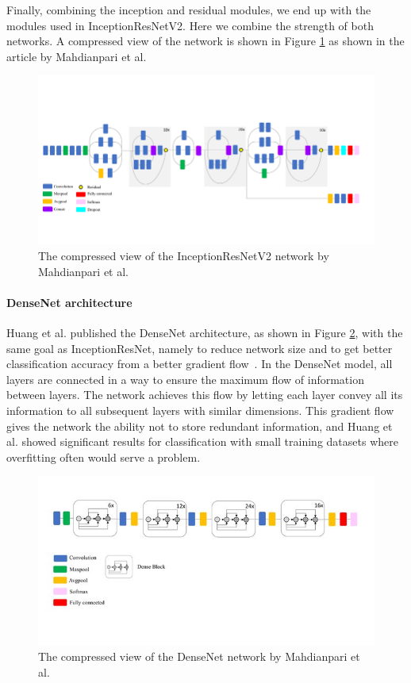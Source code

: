 Finally, combining the inception and residual modules, we end up with the modules used in InceptionResNetV2. 
Here we combine the strength of both networks. A compressed view of the network is shown in Figure \ref{fig:IRV2} as shown in the article by Mahdianpari et al.~\cite{rs10071119}
\begin{figure}
     \centering
     \includegraphics[width=1.1\textwidth]{methodology/figures/Schematic-diagram-of-InceptionResNetV2.png}
     \caption{The compressed view of the InceptionResNetV2 network by Mahdianpari et al.}
     \label{fig:IRV2}
\end{figure}

\paragraph{DenseNet architecture}
Huang et al. published the DenseNet architecture, as shown in Figure \ref{fig:DN}, with the same goal as InceptionResNet, namely to reduce network size and to get better classification accuracy from a better gradient flow~\cite{Huang_2017}.
In the DenseNet model, all layers are connected in a way to ensure the maximum flow of information between layers. The network achieves this flow by letting each layer convey all its information to all subsequent layers with similar dimensions. This gradient flow gives the network the ability not to store redundant information, and Huang et al. showed significant results for classification with small training datasets where overfitting often would serve a problem.

\begin{figure}
     \centering
     \includegraphics[width=1.1\textwidth]{methodology/figures/Schematic-diagram-of-DenseNet-model.jpg}
     \caption{The compressed view of the DenseNet network by Mahdianpari et al.}
     \label{fig:DN}
\end{figure}

